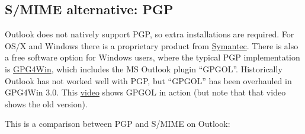 \documentclass[pdftex,12pt,titlepage=false]{scrartcl}
\begin{document}
\begin{appendices}%
  \begin{minipage}{\textwidth} %
    \section{S/MIME alternative: PGP}
    Outlook does not natively support PGP, so extra installations are
    required.  For OS/X and Windows there is a proprietary product from
    \href{https://www.symantec.com/products/desktop-email-encryption}{Symantec}.
    There is also a free software option for Windows users, where the
    typical PGP implementation is
    \href{https://www.gpg4win.org/version3.html}{GPG4Win}, which includes
    the MS Outlook plugin ``GPGOL''.  Historically Outlook has not worked
    well with PGP, but ``GPGOL'' has been overhauled in GPG4Win 3.0.  This
    \href{https://www.youtube.com/watch?v=-TOUeTFUfgQ}{video} shows GPGOL
    in action (but note that that video shows the old version).

    This is a comparison between PGP and S/MIME on Outlook:\\[1em]



\end{minipage}
\end{appendices}
\end{document}
